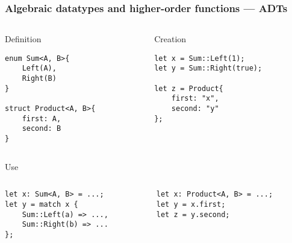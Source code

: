 \documentclass[t]{beamer}
\begin{document}
\begin{frame}[fragile]
\frametitle{Algebraic datatypes and higher-order functions --- ADTs}

\begin{columns}

\begin{column}[T]{0.48\textwidth}
\begin{block}{Definition}
\small
\begin{verbatim}
enum Sum<A, B>{
    Left(A),
    Right(B)
}

struct Product<A, B>{
    first: A,
    second: B
}
\end{verbatim}
\end{block}
\end{column}

\begin{column}[T]{0.48\textwidth}
\begin{block}{Creation}
\small
\begin{verbatim}
let x = Sum::Left(1);
let y = Sum::Right(true);

let z = Product{
    first: "x",
    second: "y"
};


\end{verbatim}
\end{block}
\end{column}

\end{columns}

\begin{block}{Use}
\begin{columns}
\begin{column}[T]{0.48\textwidth}
\small
\begin{verbatim}
let x: Sum<A, B> = ...;
let y = match x {
    Sum::Left(a) => ...,
    Sum::Right(b) => ...
};
\end{verbatim}
\end{column}
\begin{column}[T]{0.48\textwidth}
\small
\begin{verbatim}
let x: Product<A, B> = ...;
let y = x.first;
let z = y.second;
\end{verbatim}
\end{column}
\end{columns}
\end{block}

\end{frame}
\end{document}

